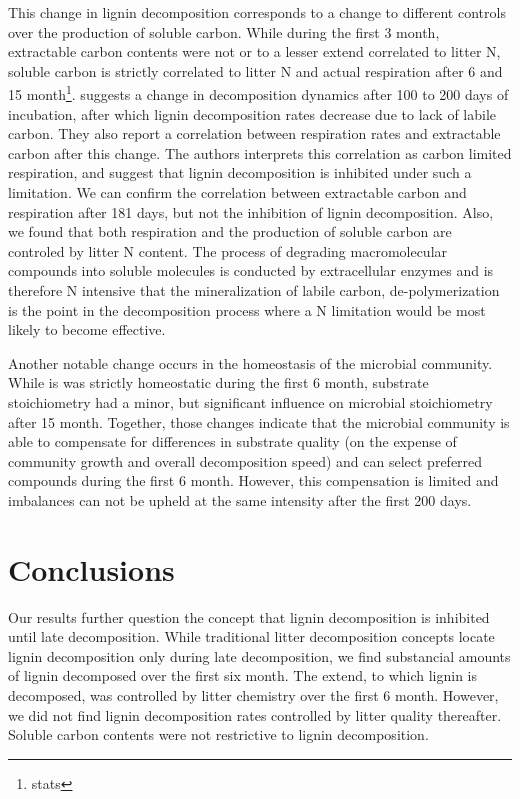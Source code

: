 \documentclass[authoryear,preprint,review,12pt]{elsarticle}
\begin{document}
This change in lignin decomposition corresponds to a change to different controls over the production of soluble carbon. While during the first 3 month, extractable carbon contents were not or to a lesser extend correlated to litter N, soluble carbon is strictly correlated to litter N and actual respiration after 6 and 15 month\footnote{stats}. \cite{Klotzbucher2011} suggests a change in decomposition dynamics after 100 to 200 days of incubation, after which lignin decomposition rates decrease due to lack of labile carbon. They also report a correlation between respiration rates and extractable carbon after this change. The authors interprets this correlation as carbon limited respiration, and suggest that lignin decomposition is inhibited under such a limitation. We can confirm the correlation between extractable carbon and respiration after 181 days, but not the inhibition of lignin decomposition. Also, we found that both respiration and the production of soluble carbon are controled by litter N content. The process of degrading macromolecular compounds into soluble molecules is conducted by extracellular enzymes and is therefore N intensive that the mineralization of labile carbon, de-polymerization is the point in the decomposition process where a N limitation would be most likely to become effective. 

Another notable change occurs in the homeostasis of the microbial community. While is was strictly homeostatic during the first 6 month, substrate stoichiometry had a minor, but significant influence on microbial stoichiometry after 15 month. Together, those changes indicate that the microbial community is able to compensate for differences in substrate quality (on the expense of community growth and overall decomposition speed) and can select preferred compounds during the first 6 month. However, this compensation is limited and imbalances can not be upheld at the same intensity after the first 200 days. 

\section{Conclusions}

Our results further question the concept that lignin decomposition is inhibited until late decomposition. While traditional litter decomposition concepts locate lignin decomposition only during late decomposition, we find substancial amounts of lignin decomposed over the first six month. The extend, to which lignin is decomposed, was controlled by litter chemistry over the first 6 month. However, we did not find lignin decomposition rates controlled by litter quality thereafter. Soluble carbon contents were not restrictive to lignin decomposition.
\end{document}
